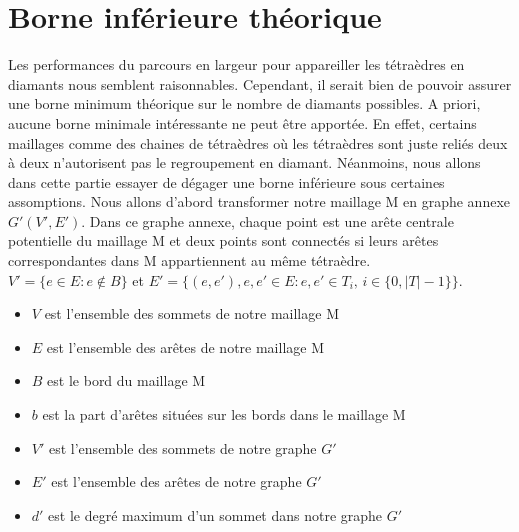\section{Borne inférieure théorique}
\noindent
Les performances du parcours en largeur pour appareiller les tétraèdres en diamants nous semblent raisonnables. Cependant, il serait bien de pouvoir assurer une borne minimum théorique sur le nombre de diamants possibles. A priori, aucune borne minimale intéressante ne peut être apportée. En effet, certains maillages comme des chaines de tétraèdres où les tétraèdres sont juste reliés deux à deux n'autorisent pas le regroupement en diamant. Néanmoins, nous allons dans cette partie essayer de dégager une borne inférieure sous certaines assomptions. Nous allons d'abord transformer notre maillage M en graphe annexe $G'(V',E')$. Dans ce graphe annexe, chaque point est une arête centrale potentielle du maillage M et deux points sont connectés si leurs arêtes correspondantes dans M appartiennent au même tétraèdre.\\
$V' = \{e\in E : e\notin B\}$ et $E'=\{(e,e'), e,e'\in E : e,e' \in T_i, \,  i\in \{0,|T|-1\}\}$.
\begin{itemize}
\item $V$ est l'ensemble des sommets de notre maillage M
\item $E$ est l'ensemble des arêtes de notre maillage M
\item $B$ est le bord du maillage M
\item $b$ est la part d'arêtes situées sur les bords dans le maillage M
\item $V'$ est l'ensemble des sommets de notre graphe $G'$
\item $E'$ est l'ensemble des arêtes de notre graphe $G'$
\item $d'$ est le degré maximum d'un sommet dans notre graphe $G'$
\end{itemize}

